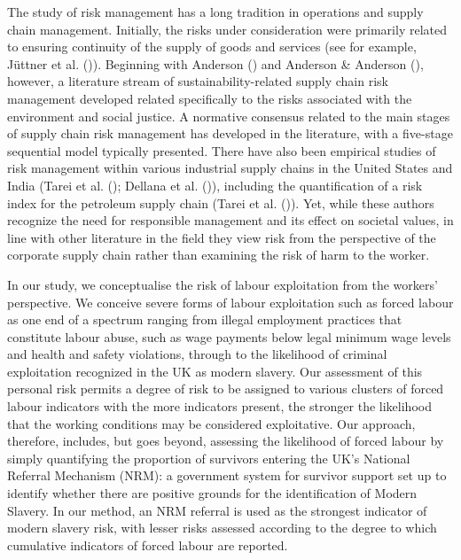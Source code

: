 \documentclass[
  12pt,
]{article}
\theoremstyle{plain}
\theoremstyle{definition}
\begin{document}
The study of risk management has a long tradition in operations and
supply chain management. Initially, the risks under consideration were
primarily related to ensuring continuity of the supply of goods and
services (see for example, Jüttner et al.
()). Beginning with Anderson
() and Anderson \& Anderson
(), however, a
literature stream of sustainability-related supply chain risk management
developed related specifically to the risks associated with the
environment and social justice. A normative consensus related to the
main stages of supply chain risk management has developed in the
literature, with a five-stage sequential model typically presented.
There have also been empirical studies of risk management within various
industrial supply chains in the United States and India (Tarei et al.
(); Dellana et al.
()), including the quantification
of a risk index for the petroleum supply chain (Tarei et al.
()). Yet, while these authors
recognize the need for responsible management and its effect on societal
values, in line with other literature in the field they view risk from
the perspective of the corporate supply chain rather than examining the
risk of harm to the worker.

In our study, we conceptualise the risk of labour exploitation from the
workers' perspective. We conceive severe forms of labour exploitation
such as forced labour as one end of a spectrum ranging from illegal
employment practices that constitute labour abuse, such as wage payments
below legal minimum wage levels and health and safety violations,
through to the likelihood of criminal exploitation recognized in the UK
as modern slavery. Our assessment of this personal risk permits a degree
of risk to be assigned to various clusters of forced labour indicators
with the more indicators present, the stronger the likelihood that the
working conditions may be considered exploitative. Our approach,
therefore, includes, but goes beyond, assessing the likelihood of forced
labour by simply quantifying the proportion of survivors entering the
UK's National Referral Mechanism (NRM): a government system for survivor
support set up to identify whether there are positive grounds for the
identification of Modern Slavery. In our method, an NRM referral is used
as the strongest indicator of modern slavery risk, with lesser risks
assessed according to the degree to which cumulative indicators of
forced labour are reported.
\end{document}
